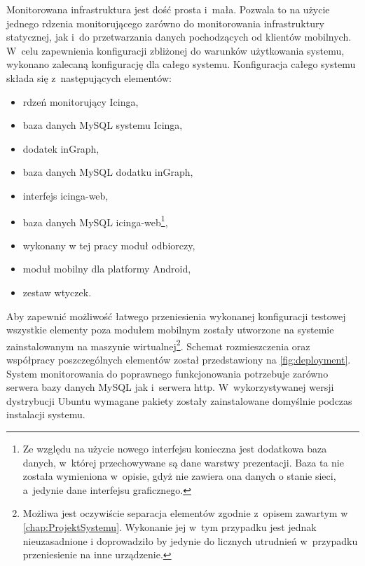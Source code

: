 Monitorowana infrastruktura jest dość prosta i~mała. Pozwala to na
użycie jednego rdzenia monitorującego zarówno do monitorowania
infrastruktury statycznej, jak i~do przetwarzania danych pochodzących
od klientów mobilnych. W~celu zapewnienia konfiguracji zbliżonej do
warunków użytkowania systemu, wykonano zalecaną konfigurację dla
całego systemu. Konfiguracja całego systemu składa się z~następujących
elementów:

\begin{itemize}
\item rdzeń monitorujący Icinga,
\item baza danych MySQL systemu Icinga,
\item dodatek inGraph,
\item baza danych MySQL dodatku inGraph,
\item interfejs icinga-web,
\item baza danych MySQL icinga-web\footnote{Ze względu na użycie
    nowego interfejsu konieczna jest dodatkowa baza danych, w~której
    przechowywane są dane warstwy prezentacji. Baza ta nie została
    wymieniona w~opisie, gdyż nie zawiera ona danych o stanie sieci,
    a~jedynie dane interfejsu graficznego.},
\item wykonany w tej pracy moduł odbiorczy,
\item moduł mobilny dla platformy Android,
\item zestaw wtyczek.
\end{itemize}

Aby zapewnić możliwość łatwego przeniesienia wykonanej konfiguracji
testowej wszystkie elementy poza modułem mobilnym zostały utworzone na
systemie zainstalowanym na maszynie wirtualnej\footnote{Możliwa jest
  oczywiście separacja elementów zgodnie z~opisem zawartym w~
  \ref{chap:ProjektSystemu}. Wykonanie jej w~tym przypadku jest jednak
  nieuzasadnione i doprowadziło by jedynie do licznych utrudnień
  w~przypadku przeniesienie na inne urządzenie.}. Schemat
rozmieszczenia oraz współpracy poszczególnych elementów został
przedstawiony na \ref{fig:deployment}. System monitorowania do
poprawnego funkcjonowania potrzebuje zarówno serwera bazy danych MySQL
jak i~serwera http. W~wykorzystywanej wersji dystrybucji Ubuntu
wymagane pakiety zostały zainstalowane domyślnie podczas instalacji
systemu.

